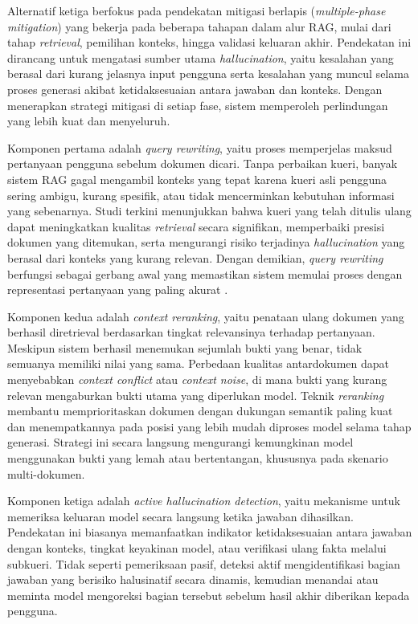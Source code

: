 Alternatif ketiga berfokus pada pendekatan mitigasi berlapis (\textit{multiple-phase mitigation}) yang bekerja pada beberapa tahapan dalam alur RAG, mulai dari tahap \textit{retrieval}, pemilihan konteks, hingga validasi keluaran akhir. Pendekatan ini dirancang untuk mengatasi sumber utama \textit{hallucination}, yaitu kesalahan yang berasal dari kurang jelasnya input pengguna serta kesalahan yang muncul selama proses generasi akibat ketidaksesuaian antara jawaban dan konteks. Dengan menerapkan strategi mitigasi di setiap fase, sistem memperoleh perlindungan yang lebih kuat dan menyeluruh.

Komponen pertama adalah \textit{query rewriting}, yaitu proses memperjelas maksud pertanyaan pengguna sebelum dokumen dicari. Tanpa perbaikan kueri, banyak sistem RAG gagal mengambil konteks yang tepat karena kueri asli pengguna sering ambigu, kurang spesifik, atau tidak mencerminkan kebutuhan informasi yang sebenarnya. Studi terkini menunjukkan bahwa kueri yang telah ditulis ulang dapat meningkatkan kualitas \textit{retrieval} secara signifikan, memperbaiki presisi dokumen yang ditemukan, serta mengurangi risiko terjadinya \textit{hallucination} yang berasal dari konteks yang kurang relevan. Dengan demikian, \textit{query rewriting} berfungsi sebagai gerbang awal yang memastikan sistem memulai proses dengan representasi pertanyaan yang paling akurat \parencite{wang2024maferw}.

Komponen kedua adalah \textit{context reranking}, yaitu penataan ulang dokumen yang berhasil diretrieval berdasarkan tingkat relevansinya terhadap pertanyaan. Meskipun sistem berhasil menemukan sejumlah bukti yang benar, tidak semuanya memiliki nilai yang sama. Perbedaan kualitas antardokumen dapat menyebabkan \textit{context conflict} atau \textit{context noise}, di mana bukti yang kurang relevan mengaburkan bukti utama yang diperlukan model. Teknik \textit{reranking} membantu memprioritaskan dokumen dengan dukungan semantik paling kuat dan menempatkannya pada posisi yang lebih mudah diproses model selama tahap generasi. Strategi ini secara langsung mengurangi kemungkinan model menggunakan bukti yang lemah atau bertentangan, khususnya pada skenario multi-dokumen.

Komponen ketiga adalah \textit{active hallucination detection}, yaitu mekanisme untuk memeriksa keluaran model secara langsung ketika jawaban dihasilkan. Pendekatan ini biasanya memanfaatkan indikator ketidaksesuaian antara jawaban dengan konteks, tingkat keyakinan model, atau verifikasi ulang fakta melalui subkueri. Tidak seperti pemeriksaan pasif, deteksi aktif mengidentifikasi bagian jawaban yang berisiko halusinatif secara dinamis, kemudian menandai atau meminta model mengoreksi bagian tersebut sebelum hasil akhir diberikan kepada pengguna.

